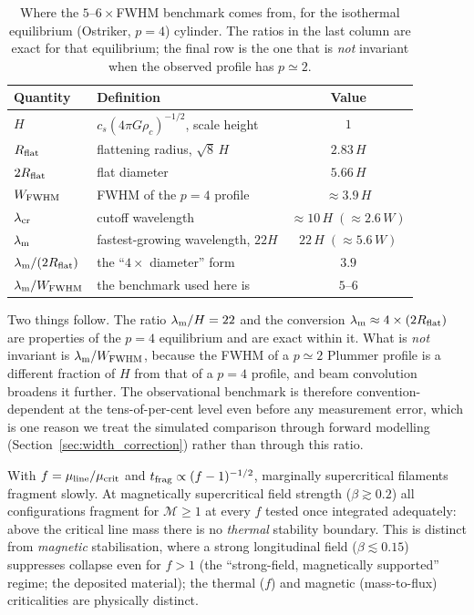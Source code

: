 \documentclass[usenatbib,twoside,twocolumn]{mnras}
\begin{document}
\begin{table}
\caption{Where the $5$--$6\times$FWHM benchmark comes from, for the isothermal equilibrium (Ostriker, $p=4$) cylinder. The ratios in the last column are exact for that equilibrium; the final row is the one that is \emph{not} invariant when the observed profile has $p\simeq2$.}
\label{tab:benchmark}
\footnotesize
\setlength{\tabcolsep}{4pt}
\begin{tabular}{llc}
\toprule
Quantity & Definition & Value \\
\midrule
$H$ & $c_s(4\pi G\rho_c)^{-1/2}$, scale height & $1$ \\
$R_{\rm flat}$ & flattening radius, $\sqrt{8}\,H$ & $2.83\,H$ \\
$2R_{\rm flat}$ & flat diameter & $5.66\,H$ \\
$W_{\rm FWHM}$ & FWHM of the $p=4$ profile & $\approx3.9\,H$ \\
$\lambda_{\rm cr}$ & cutoff wavelength & $\approx10\,H\;(\approx2.6\,W)$ \\
$\lambda_{\rm m}$ & fastest-growing wavelength, $22H$ & $22\,H\;(\approx5.6\,W)$ \\
\midrule
$\lambda_{\rm m}/(2R_{\rm flat})$ & the ``$4\times$ diameter'' form & $3.9$ \\
$\lambda_{\rm m}/W_{\rm FWHM}$ & the benchmark used here is & $5$--$6$ \\
\bottomrule
\end{tabular}
\end{table}

Two things follow. The ratio $\lambda_{\rm m}/H=22$ and the conversion $\lambda_{\rm m}\approx4\times(2R_{\rm flat})$ are properties of the $p=4$ equilibrium and are exact within it. What is \emph{not} invariant is $\lambda_{\rm m}/W_{\rm FWHM}$, because the FWHM of a $p\simeq2$ Plummer profile is a different fraction of $H$ from that of a $p=4$ profile, and beam convolution broadens it further. The observational benchmark is therefore convention-dependent at the tens-of-per-cent level even before any measurement error, which is one reason we treat the simulated comparison through forward modelling (Section~\ref{sec:width_correction}) rather than through this ratio.

With $f=\mu_{\rm line}/\mu_{\rm crit}$ and $t_{\rm frag}\propto(f-1)^{-1/2}$, marginally supercritical filaments fragment slowly. At magnetically supercritical field strength ($\beta\gtrsim0.2$) all configurations fragment for $\mathcal{M}\geq1$ at every $f$ tested once integrated adequately: above the critical line mass there is no \emph{thermal} stability boundary. This is distinct from \emph{magnetic} stabilisation, where a strong longitudinal field ($\beta\lesssim0.15$) suppresses collapse even for $f>1$ (the ``strong-field, magnetically supported'' regime; the deposited material); the thermal ($f$) and magnetic (mass-to-flux) criticalities are physically distinct.
\end{document}
